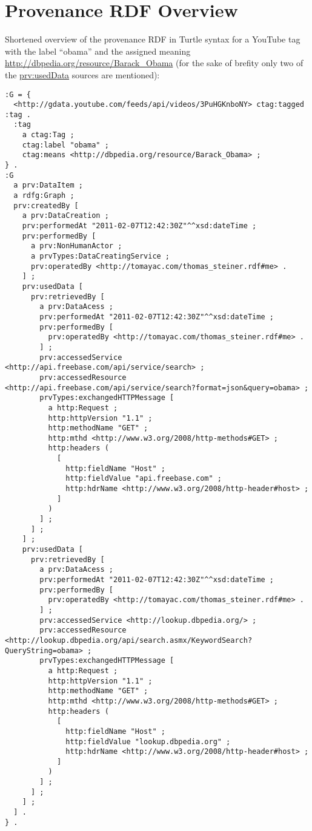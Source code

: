 \documentclass{acm_proc_article-sp}
\begin{document}
\section{Provenance RDF Overview}\label{sec:appendix}
Shortened overview of the provenance RDF in Turtle syntax for a YouTube tag with the label ``obama'' and the assigned meaning \url{http://dbpedia.org/resource/Barack_Obama} (for the sake of brefity only two of the \url{prv:usedData} sources are mentioned):
\begin{lstlisting}
:G = {
  <http://gdata.youtube.com/feeds/api/videos/3PuHGKnboNY> ctag:tagged :tag .
  :tag
    a ctag:Tag ;
    ctag:label "obama" ;
    ctag:means <http://dbpedia.org/resource/Barack_Obama> ;
} .
:G
  a prv:DataItem ;
  a rdfg:Graph ;
  prv:createdBy [
    a prv:DataCreation ;
    prv:performedAt "2011-02-07T12:42:30Z"^^xsd:dateTime ;
    prv:performedBy [
      a prv:NonHumanActor ;
      a prvTypes:DataCreatingService ;
      prv:operatedBy <http://tomayac.com/thomas_steiner.rdf#me> .
    ] ;
    prv:usedData [
      prv:retrievedBy [
        a prv:DataAcess ;
        prv:performedAt "2011-02-07T12:42:30Z"^^xsd:dateTime ;
        prv:performedBy [
          prv:operatedBy <http://tomayac.com/thomas_steiner.rdf#me> .
        ] ;
        prv:accessedService <http://api.freebase.com/api/service/search> ;
        prv:accessedResource <http://api.freebase.com/api/service/search?format=json&query=obama> ;
        prvTypes:exchangedHTTPMessage [
          a http:Request ;
          http:httpVersion "1.1" ;
          http:methodName "GET" ;
          http:mthd <http://www.w3.org/2008/http-methods#GET> ;
          http:headers (
            [
              http:fieldName "Host" ;
              http:fieldValue "api.freebase.com" ;
              http:hdrName <http://www.w3.org/2008/http-header#host> ;
            ]
          )
        ] ;
      ] ;
    ] ;
    prv:usedData [
      prv:retrievedBy [
        a prv:DataAcess ;
        prv:performedAt "2011-02-07T12:42:30Z"^^xsd:dateTime ;
        prv:performedBy [
          prv:operatedBy <http://tomayac.com/thomas_steiner.rdf#me> .
        ] ;
        prv:accessedService <http://lookup.dbpedia.org/> ;
        prv:accessedResource <http://lookup.dbpedia.org/api/search.asmx/KeywordSearch?QueryString=obama> ;
        prvTypes:exchangedHTTPMessage [
          a http:Request ;
          http:httpVersion "1.1" ;
          http:methodName "GET" ;
          http:mthd <http://www.w3.org/2008/http-methods#GET> ;
          http:headers (
            [
              http:fieldName "Host" ;
              http:fieldValue "lookup.dbpedia.org" ;
              http:hdrName <http://www.w3.org/2008/http-header#host> ;
            ]
          )
        ] ;
      ] ;
    ] ;
  ] .
} .
\end{lstlisting}

\balancecolumns
\end{document}
